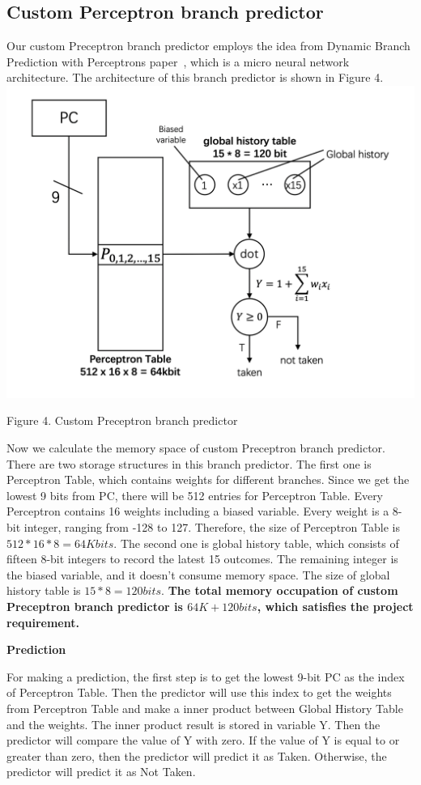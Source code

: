 \documentclass[conference]{IEEEtran}
\begin{document}
\subsection{Custom Perceptron branch predictor}
Our custom Preceptron branch predictor employs the idea from Dynamic Branch Prediction with Perceptrons paper~\cite{nicepaper4}, which is a micro neural network architecture. The architecture of this branch predictor is shown in Figure 4.
\includegraphics[width=\linewidth]{perceptron.png}
\begin{center}
  {\small Figure 4. Custom Preceptron branch predictor}
\end{center}

Now we calculate the memory space of custom Preceptron branch predictor. There are two storage structures in this branch predictor. 
The first one is Perceptron Table, which contains weights for different branches. Since we get the lowest 9 bits from PC, there will be 512 entries for Perceptron Table. 
Every Perceptron contains 16 weights including a biased variable. Every weight is a 8-bit integer, ranging from -128 to 127. Therefore, the size of Perceptron Table is $512*16*8 = 64K bits$. 
The second one is global history table, which consists of fifteen 8-bit integers to record the latest 15 outcomes. The remaining integer is the biased variable, and it doesn't consume memory space. 
The size of global history table is $15*8 = 120 bits$. 
\textbf{The total memory occupation of custom Preceptron branch predictor is $64K + 120 bits$, which satisfies the project requirement.}

\begin{center}
  \textbf{Prediction}
\end{center}
For making a prediction, the first step is to get the lowest 9-bit PC as the index of Perceptron Table. Then the predictor will use this index to get the weights from Perceptron Table and make a inner product between Global History Table and the weights.
The inner product result is stored in variable Y. Then the predictor will compare the value of Y with zero. If the value of Y is equal to or greater than zero, then the predictor will predict it as Taken. Otherwise, the predictor will predict it as 
Not Taken.
\end{document}
